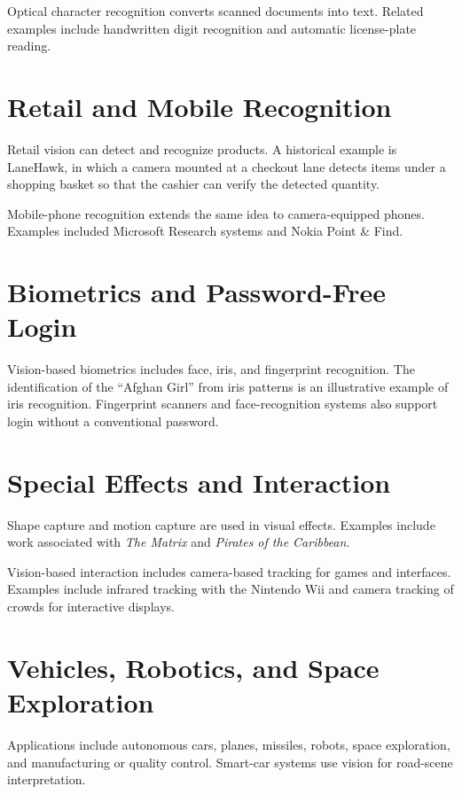 \documentclass[11pt,a4paper,oneside]{report}
\begin{document}
Optical character recognition converts scanned documents into text. Related examples include handwritten digit recognition and automatic license-plate reading.

\section{Retail and Mobile Recognition}

Retail vision can detect and recognize products. A historical example is LaneHawk, in which a camera mounted at a checkout lane detects items under a shopping basket so that the cashier can verify the detected quantity.

Mobile-phone recognition extends the same idea to camera-equipped phones. Examples included Microsoft Research systems and Nokia Point \& Find.

\section{Biometrics and Password-Free Login}

Vision-based biometrics includes face, iris, and fingerprint recognition. The identification of the ``Afghan Girl'' from iris patterns is an illustrative example of iris recognition. Fingerprint scanners and face-recognition systems also support login without a conventional password.

\section{Special Effects and Interaction}

Shape capture and motion capture are used in visual effects. Examples include work associated with \emph{The Matrix} and \emph{Pirates of the Caribbean}.

Vision-based interaction includes camera-based tracking for games and interfaces. Examples include infrared tracking with the Nintendo Wii and camera tracking of crowds for interactive displays.

\section{Vehicles, Robotics, and Space Exploration}

Applications include autonomous cars, planes, missiles, robots, space exploration, and manufacturing or quality control. Smart-car systems use vision for road-scene interpretation.
\end{document}
